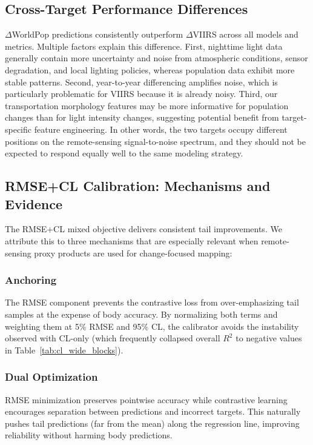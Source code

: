 \documentclass[preprint,12pt]{elsarticle}
\begin{document}
\subsection{Cross-Target Performance Differences}

$\Delta$WorldPop predictions consistently outperform $\Delta$VIIRS across all models and metrics. Multiple factors explain this difference. First, nighttime light data generally contain more uncertainty and noise from atmospheric conditions, sensor degradation, and local lighting policies, whereas population data exhibit more stable patterns. Second, year-to-year differencing amplifies noise, which is particularly problematic for VIIRS because it is already noisy. Third, our transportation morphology features may be more informative for population changes than for light intensity changes, suggesting potential benefit from target-specific feature engineering. In other words, the two targets occupy different positions on the remote-sensing signal-to-noise spectrum, and they should not be expected to respond equally well to the same modeling strategy.

\subsection{RMSE+CL Calibration: Mechanisms and Evidence}

The RMSE+CL mixed objective delivers consistent tail improvements. We attribute this to three mechanisms that are especially relevant when remote-sensing proxy products are used for change-focused mapping:

\subsubsection{Anchoring}
The RMSE component prevents the contrastive loss from over-emphasizing tail samples at the expense of body accuracy. By normalizing both terms and weighting them at 5\% RMSE and 95\% CL, the calibrator avoids the instability observed with CL-only (which frequently collapsed overall $R^2$ to negative values in Table~\ref{tab:cl_wide_blocks}).

\subsubsection{Dual Optimization}
RMSE minimization preserves pointwise accuracy while contrastive learning encourages separation between predictions and incorrect targets. This naturally pushes tail predictions (far from the mean) along the regression line, improving reliability without harming body predictions.
\end{document}
